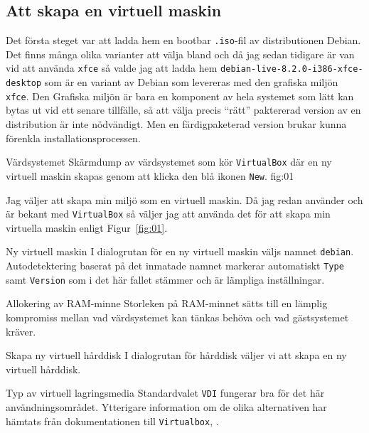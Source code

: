 \subsection{Att skapa en virtuell maskin}
Det första steget var att ladda hem en bootbar \texttt{.iso}-fil av
distributionen Debian. Det finns många olika varianter att välja bland och då
jag sedan tidigare är van vid att använda \texttt{xfce} så valde jag att ladda
hem \texttt{debian-live-8.2.0-i386-xfce-desktop} som är en variant av Debian
som levereras med den grafiska miljön \texttt{xfce}. Den Grafiska miljön är
bara en komponent av hela systemet som lätt kan bytas ut vid ett senare
tillfälle, så att välja precis ``rätt'' paktererad version av en distribution
är inte nödvändigt.  Men en färdigpaketerad version brukar kunna förenkla
installationsprocessen.

           {Värdsystemet}
           {Skärmdump av värdsystemet som kör \texttt{VirtualBox} där en ny
            virtuell maskin skapas genom att klicka den blå ikonen
            \texttt{New}.}
           {fig:01}

Jag väljer att skapa min miljö som en virtuell maskin. Då jag redan använder
och är bekant med \texttt{VirtualBox} så väljer jag att använda det för att
skapa min virtuella maskin enligt Figur~\ref{fig:01}.

           {Ny virtuell maskin}
           {I dialogrutan för en ny virtuell maskin väljs namnet
            \texttt{debian}. Autodetektering baserat på det inmatade
            namnet markerar automatiskt \texttt{Type} samt \texttt{Version}
            som i det här fallet stämmer och är lämpliga inställningar.}
           {}

           {Allokering av RAM-minne}
           {Storleken på RAM-minnet sätts till en lämplig kompromiss mellan
            vad värdsystemet kan tänkas behöva och vad gästsystemet kräver.}
           {}

           {Skapa ny virtuell hårddisk}
           {I dialogrutan för hårddisk väljer vi att skapa en ny virtuell
            hårddisk.}
           {}

           {Typ av virtuell lagringsmedia}
           {Standardvalet \texttt{VDI} fungerar bra för det här
            användningsområdet. Ytterigare information om de olika alternativen
            har hämtats från dokumentationen till \texttt{Virtualbox},
            \cite{virtualbox:vdidetails}.}
           {}

